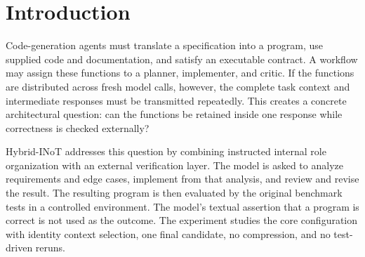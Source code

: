 
\begin{abstract}
Hybrid-INoT combines planning, implementation, and critique in one model response while leaving correctness verification to an external executable evaluator. We isolate this single-pass core by crossing role labels (neutral versus planner--implementer--reviewer) with call structure (one versus three calls), holding the operations and full supplied task context fixed. A direct solver is the fifth condition. In the largest completed study, GPT-5.6 Luna with medium reasoning receives 15,000 assignments on 1,000 BigCodeBench tasks with three repeats per condition; 14,961 candidates complete and 985 tasks pass reference controls. Role labels do not yield a corrected quality rejection. Three-call execution lowers success by 4.17 percentage points for neutral instructions and 2.13 points for role-labelled instructions, while requiring 2.67 and 2.78 times the corresponding single-call API-equivalent valuations. These results identify a cost of the tested interaction structure, without establishing a universal claim about multi-agent systems or quality preservation. Earlier mini and layout studies are retained as separate scopes. A planned comparison with Self-Collaboration is described as a method and feasibility study while its native outcomes remain pending.
\end{abstract}

\section{Introduction}
Code-generation agents must translate a specification into a program, use supplied code and documentation, and satisfy an executable contract. A workflow may assign these functions to a planner, implementer, and critic. If the functions are distributed across fresh model calls, however, the complete task context and intermediate responses must be transmitted repeatedly. This creates a concrete architectural question: can the functions be retained inside one response while correctness is checked externally?

Hybrid-INoT addresses this question by combining instructed internal role organization with an external verification layer. The model is asked to analyze requirements and edge cases, implement from that analysis, and review and revise the result. The resulting program is then evaluated by the original benchmark tests in a controlled environment. The model's textual assertion that a program is correct is not used as the outcome. The experiment studies the core configuration with identity context selection, one final candidate, no compression, and no test-driven reruns.

